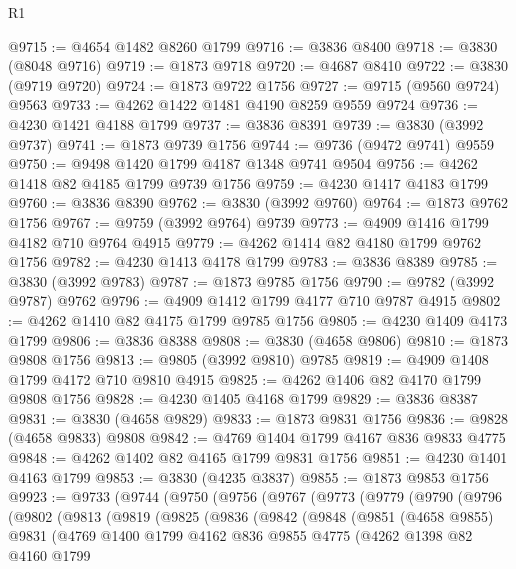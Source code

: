 \begin{lexlean}{R1}
\begin{coremodule}
@9715 := @4654 @1482 @8260 @1799
@9716 := @3836 @8400
@9718 := @3830 (@8048 @9716)
@9719 := @1873 @9718
@9720 := @4687 @8410
@9722 := @3830 (@9719 @9720)
@9724 := @1873 @9722 @1756
@9727 := @9715 (@9560 @9724) @9563
@9733 := @4262 @1422 @1481 @4190 @8259 @9559 @9724
@9736 := @4230 @1421 @4188 @1799
@9737 := @3836 @8391
@9739 := @3830 (@3992 @9737)
@9741 := @1873 @9739 @1756
@9744 := @9736 (@9472 @9741) @9559
@9750 := @9498 @1420 @1799 @4187 @1348 @9741 @9504
@9756 := @4262 @1418 @82 @4185 @1799 @9739 @1756
@9759 := @4230 @1417 @4183 @1799
@9760 := @3836 @8390
@9762 := @3830 (@3992 @9760)
@9764 := @1873 @9762 @1756
@9767 := @9759 (@3992 @9764) @9739
@9773 := @4909 @1416 @1799 @4182 @710 @9764 @4915
@9779 := @4262 @1414 @82 @4180 @1799 @9762 @1756
@9782 := @4230 @1413 @4178 @1799
@9783 := @3836 @8389
@9785 := @3830 (@3992 @9783)
@9787 := @1873 @9785 @1756
@9790 := @9782 (@3992 @9787) @9762
@9796 := @4909 @1412 @1799 @4177 @710 @9787 @4915
@9802 := @4262 @1410 @82 @4175 @1799 @9785 @1756
@9805 := @4230 @1409 @4173 @1799
@9806 := @3836 @8388
@9808 := @3830 (@4658 @9806)
@9810 := @1873 @9808 @1756
@9813 := @9805 (@3992 @9810) @9785
@9819 := @4909 @1408 @1799 @4172 @710 @9810 @4915
@9825 := @4262 @1406 @82 @4170 @1799 @9808 @1756
@9828 := @4230 @1405 @4168 @1799
@9829 := @3836 @8387
@9831 := @3830 (@4658 @9829)
@9833 := @1873 @9831 @1756
@9836 := @9828 (@4658 @9833) @9808
@9842 := @4769 @1404 @1799 @4167 @836 @9833 @4775
@9848 := @4262 @1402 @82 @4165 @1799 @9831 @1756
@9851 := @4230 @1401 @4163 @1799
@9853 := @3830 (@4235 @3837)
@9855 := @1873 @9853 @1756
@9923 := @9733
    (@9744
      (@9750
        (@9756
          (@9767
            (@9773
              (@9779
                (@9790
                  (@9796
                    (@9802
                      (@9813
                        (@9819
                          (@9825
                            (@9836
                              (@9842
                                (@9848
                                  (@9851
                                    (@4658 @9855)
                                    @9831
                                    (@4769
                                      @1400
                                      @1799
                                      @4162
                                      @836
                                      @9855
                                      @4775
                                      (@4262
                                        @1398
                                        @82
                                        @4160
                                        @1799

\end{coremodule}
\end{lexlean}
